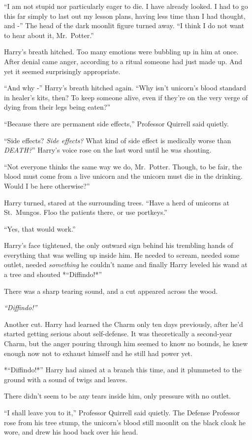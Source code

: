 ``I am not stupid nor particularly eager to die. I have already looked.
I had to go this far simply to last out my lesson plans, having less
time than I had thought, and -'' The head of the dark moonlit figure
turned away. ``I think I do not want to hear about it, Mr.~Potter.''

Harry's breath hitched. Too many emotions were bubbling up in him at
once. After denial came anger, according to a ritual someone had just
made up. And yet it seemed surprisingly appropriate.

``And why -'' Harry's breath hitched again. ``Why isn't unicorn's blood
standard in healer's kits, then? To keep someone alive, even if they're
on the very verge of dying from their legs being eaten?''

``Because there are permanent side effects,'' Professor Quirrell said
quietly.

``Side effects? \emph{Side effects?} What kind of side effect is
medically worse than \emph{DEATH?}'' Harry's voice rose on the last word
until he was shouting.

``Not everyone thinks the same way we do, Mr.~Potter. Though, to be
fair, the blood must come from a live unicorn and the unicorn must die
in the drinking. Would I be here otherwise?''

Harry turned, stared at the surrounding trees. ``Have a herd of unicorns
at St.~Mungos. Floo the patients there, or use portkeys.''

``Yes, that would work.''

Harry's face tightened, the only outward sign behind his trembling hands
of everything that was welling up inside him. He needed to scream,
needed some outlet, needed \emph{something} he couldn't name and finally
Harry leveled his wand at a tree and shouted *``Diffindo!*''

There was a sharp tearing sound, and a cut appeared across the wood.

\emph{``Diffindo!''}

Another cut. Harry had learned the Charm only ten days previously, after
he'd started getting serious about self-defense. It was theoretically a
second-year Charm, but the anger pouring through him seemed to know no
bounds, he knew enough now not to exhaust himself and he still had power
yet.

*``Diffindo!*'' Harry had aimed at a branch this time, and it plummeted
to the ground with a sound of twigs and leaves.

There didn't seem to be any tears inside him, only pressure with no
outlet.

``I shall leave you to it,'' Professor Quirrell said quietly. The
Defense Professor rose from his tree stump, the unicorn's blood still
moonlit on the black cloak he wore, and drew his hood back over his
head.
